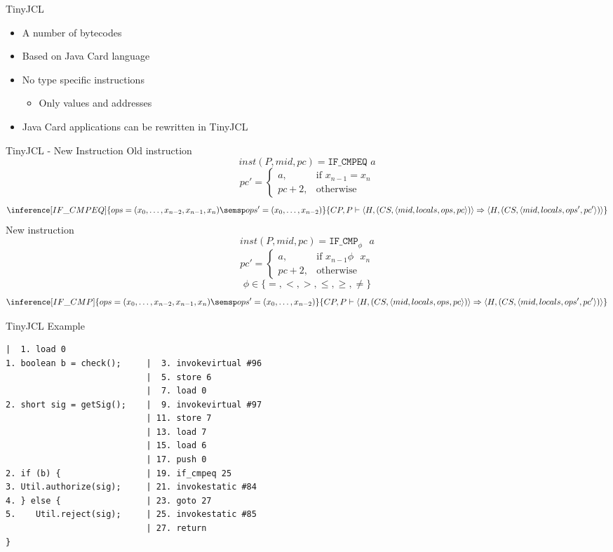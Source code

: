 \begin{frame}[fragile]{TinyJCL}
  \begin{itemize}
  \item A number of bytecodes
  \item Based on Java Card language
  \item No type specific instructions
    \begin{itemize}
    \item Only values and addresses
    \end{itemize}
  \item Java Card applications can be rewritten in TinyJCL
  \end{itemize}
\end{frame}

\begin{frame}[fragile]{TinyJCL - New Instruction}
Old instruction
\scriptsize{
$$inst(P, mid, pc) = \texttt{IF\_CMPEQ }a$$
\[
    pc'= 
\begin{cases}
    a,& \text{if } x_{n-1} = x_n\\
    pc+2,              & \text{otherwise}
\end{cases}
\]
$$\inference[IF\_CMPEQ]{ops=(x_0, \ldots, x_{n-2}, x_{n-1}, x_n) \semsp ops'=(x_0, \ldots, x_{n-2})}
{CP, P \vdash \langle H, (CS, \langle mid, locals, ops, pc \rangle)\rangle \Rightarrow \langle H, (CS, \langle mid, locals, ops', pc' \rangle)\rangle}$$
}
\normalsize{New instruction}
\scriptsize{
$$inst(P, mid, pc) = \texttt{IF\_CMP}_{\phi} \text{ }a$$
\[
    pc'= 
\begin{cases}
    a,& \text{if } x_{n-1} \phi \text{ } x_n\\
    pc+2,              & \text{otherwise}
\end{cases}
\]
$$\phi \in \{ =, <, >, \leq, \geq, \neq \}$$
$$\inference[IF\_CMP]{ops=(x_0, \ldots, x_{n-2}, x_{n-1}, x_n) \semsp ops'=(x_0, \ldots, x_{n-2})}
{CP, P \vdash \langle H, (CS, \langle mid, locals, ops, pc \rangle)\rangle \Rightarrow \langle H, (CS, \langle mid, locals, ops', pc' \rangle)\rangle}$$}
\end{frame}

\begin{frame}[fragile]{TinyJCL Example}
\begin{lstlisting}[numbers=none, moredelim={[is][keywordstyle]{@@}{@@}}]
                            |  1. load 0               
1. boolean b = check();     |  3. invokevirtual #96     
                            |  5. store 6              
                            |  7. load 0
2. short sig = getSig();    |  9. invokevirtual #97
                            | 11. store 7
                            | 13. load 7
                            | 15. load 6
                            | 17. push 0               
2. if (b) {                 | 19. if_cmpeq 25               
3. Util.authorize(sig);     | 21. invokestatic #84
4. } else {                 | 23. goto 27
5.    Util.reject(sig);     | 25. invokestatic #85
                            | 27. return                  
}                           
\end{lstlisting}
\end{frame}
